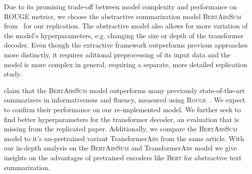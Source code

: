 Due to its promising trade-off between model complexity and performance on ROUGE metrics, we choose the abstractive summarization model \textsc{BertAbsSum} from~\citeauthor{LiuL2019} for our replication. The abstractive model also allows for more variation of the model's hyperparameters, e.g. changing the size or depth of the transformer decoder. 
Even though the extractive framework outperforms previous approaches more  distinctly, it requires aditional preprocessing of its input data and the model is more complex in general, requiring a separate, more detailed replication study.

\citeauthor{LiuL2019} claim that the \textsc{BertAbsSum} model outperforms many previously state-of-the-art summarizers in informativeness and fluency, measured using \textsc{Rouge}~\cite{LiuL2019,Lin2004}.
We expect to confirm their performance on our re-implemented model.
We further seek to find better hyperparameters for the transformer decoder, an evaluation that is missing from the replicated paper.
Additionally, we compare the \textsc{BertAbsSum} model to it's un-pretrained variant Transformer\textsc{Abs} from the same article.
With our in-depth analysis on the \textsc{BertAbsSum} and Transformer\textsc{Abs} model we give insights on the advantages of pretrained encoders like \textsc{Bert} for abstractive text summarization.
